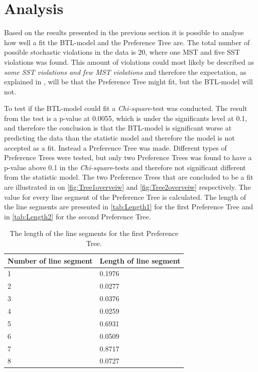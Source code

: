 \section*{Analysis}
\label{Analyse}
%
Based on the results presented in the previous section it is possible to analyse how well a fit the BTL-model and the Preference Tree are.\blankline
%
The total number of possible stochastic violations in the data is 20, where one MST and five SST violations was found. This amount of violations could most likely be described as \textit{some SST violations and few MST violations} and therefore the expectation, as explained in , will be that the Preference Tree might fit, but the BTL-model will not. 

To test if the BTL-model could fit a \textit{Chi-square}-test was conducted. The result from the test is a p-value at 0.0055, which is under the significants level at 0.1, and therefore the conclusion is that the BTL-model is significant worse at predicting the data than the statistic model and therefore the model is not accepted as a fit. Instead a Preference Tree was made.\blankline
%
Different types of Preference Trees were tested, but only two Preference Trees was found to have a p-value above 0.1 in the \textit{Chi-square}-tests and therefore not significant different from the statistic model. The two Preference Trees that are concluded to be a fit are illustrated in  on \autoref{fig:Tree1overveiw} and \autoref{fig:Tree2overveiw} respectively. The value for every line segment of the Preference Tree is calculated. The length of the line segments are presented in \autoref{tab:Length1} for the first Preference Tree and in \autoref{tab:Length2} for the second Preference Tree.  
%
\begin{table}[H]
	\centering
	\begin{tabular}{@{}ll@{}}
		\toprule
		Number of line segment  & Length of line segment \\ \midrule
		1					    & 0.1976   \\
		2      				    & 0.0277   \\
		3      				    & 0.0376   \\
		4      					& 0.0259   \\
		5      					& 0.6931   \\
		6      					& 0.0509   \\
		7      					& 0.8717   \\
		8						& 0.0727   \\ \bottomrule
	\end{tabular}
	\caption{The length of the line segments for the first Preference Tree.}
	\label{tab:Length1}
\end{table} 
